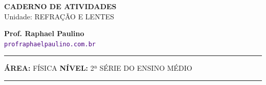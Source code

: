 \documentclass[twoside, 10pt, a4paper]{article}
\begin{document}
\thispagestyle{empty}
\color{Cinzablack}
\vspace*{-1.8cm}

\noindent
\begin{minipage}{\textwidth}
    \selectfont
    \noindent
    \begin{minipage}[t]{0.70\linewidth}
        {\Large \bfseries \MakeUppercase{Caderno de Atividades}}\\[0.1cm]
        {\large \textmd{\textcolor{CinzaEscuro}{Unidade: REFRAÇÃO E LENTES}}}
    \end{minipage}%
    \begin{minipage}[t]{0.30\linewidth}
        \raggedleft
        \small \textbf{Prof. Raphael Paulino}\\
        \textsf{\small \textcolor{indigo}{\texttt{profraphaelpaulino.com.br}}}
    \end{minipage}
    
    \vspace{0.15cm}
    \noindent\rule{\linewidth}{1.2pt}
    \vspace{-0.1cm}
    \footnotesize\textsf{\textbf{ÁREA:} FÍSICA \hfill \textbf{NÍVEL:} 2ª SÉRIE DO ENSINO MÉDIO}
    \vspace{0.1cm}
    \noindent\rule{\linewidth}{0.4pt}
\end{minipage}
\end{document}
